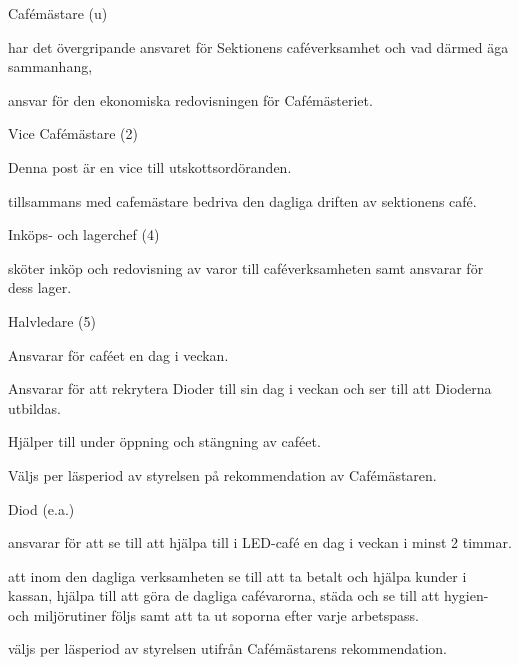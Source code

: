 \documentclass[10pt]{article}
\begin{document}
\begin{emptylist}
    \item Cafémästare (u)
        \begin{dashlist}
            \item har det övergripande ansvaret för Sektionens
                caféverksamhet och vad därmed äga sammanhang,
            \item ansvar för den ekonomiska redovisningen för
                Cafémästeriet.
        \end{dashlist}
    \item Vice Cafémästare (2)
        \begin{dashlist}
            \item Denna post är en vice till utskottsordöranden.
            \item tillsammans med cafemästare bedriva den dagliga driften
                av sektionens café.
        \end{dashlist}
    \item Inköps- och lagerchef (4)
        \begin{dashlist}
            \item sköter inköp och redovisning av varor till
                caféverksamheten samt ansvarar för dess lager.
        \end{dashlist}
    \item Halvledare (5)
    \begin{tightdashlist}
        \item Ansvarar för caféet en dag i veckan.
        \item Ansvarar för att rekrytera Dioder till sin dag i veckan och ser till att Dioderna utbildas.
        \item Hjälper till under öppning och stängning av caféet.
        \item Väljs per läsperiod av styrelsen på rekommendation av Cafémästaren.
    \end{tightdashlist}
    \item Diod (e.a.)
    		\begin{dashlist}
            \item ansvarar för att se till att hjälpa till i LED-café en dag i veckan i minst 2 timmar.
            \item att inom den dagliga verksamheten se till att ta betalt och hjälpa kunder i kassan, hjälpa till att göra de dagliga cafévarorna, städa och se till att hygien- och miljörutiner följs samt att ta ut soporna efter varje arbetspass.
            \item väljs per läsperiod av styrelsen utifrån Cafémästarens rekommendation.
        \end{dashlist}
\end{emptylist}
\end{document}

